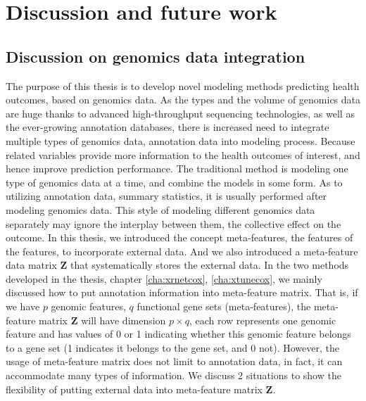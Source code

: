 \chapter{Discussion and future work}
\label{cha:conclusion}

\section*{Discussion on genomics data integration}
The purpose of this thesis is to develop novel modeling methods predicting health outcomes, based on genomics data. As the types and the volume of genomics data are huge thanks to advanced high-throughput sequencing technologies, as well as the ever-growing annotation databases, there is increased need to integrate multiple types of genomics data, annotation data into modeling process. Because related variables provide more information to the health outcomes of interest, and hence improve prediction performance. The traditional method is modeling one type of genomics data at a time, and combine the models in some form. As to utilizing annotation data, summary statistics, it is usually performed after modeling genomics data. This style of modeling different genomics data separately may ignore the interplay between them, the collective effect on the outcome. In this thesis, we introduced the concept meta-features, the features of the features, to incorporate external data. And we also introduced a meta-feature data matrix $\bm{Z}$ that systematically stores the external data. In the two methods developed in the thesis, chapter \ref{cha:xrnetcox}, \ref{cha:xtunecox}, we mainly discussed how to put annotation information into meta-feature matrix. That is, if we have $p$ genomic features, $q$ functional gene sets (meta-features), the meta-feature matrix $\bm{Z}$ will have dimension $p\times q$, each row represents one genomic feature and has values of 0 or 1 indicating whether this genomic feature belongs to a gene set (1 indicates it belongs to the gene set, and 0 not). However, the usage of meta-feature matrix does not limit to annotation data, in fact, it can accommodate many types of information. We discuss 2 situations to show the flexibility of putting external data into meta-feature matrix $\bm{Z}$.

